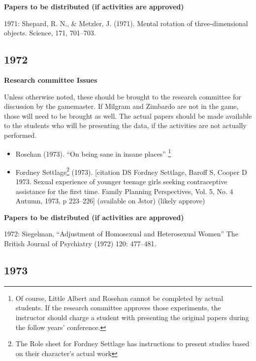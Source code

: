 \begin{refsection}
\begin{itemize}
\end{itemize}

\textbf{Papers to be distributed (if activities are approved)}

1971: Shepard, R. N., \& Metzler, J. (1971). Mental rotation of three-dimensional objects. Science, 171, 701--703.

\newpage

\subsection{1972}
\label{1972}

\textbf{Research committee Issues}

Unless otherwise noted, these should be brought to the research committee for discussion by the gamemaster. If Milgram and Zimbardo are not in the game, those will need to be brought as well. The actual papers should be made available to the students who will be presenting the data, if the activities are not actually performed.

\begin{itemize}
\item Rosehan (1973). ``On being sane in insane places'' \footnote{Of course, Little Albert and Rosehan cannot be completed by actual students. If the research committee approves those experiments, the instructor should charge a student with presenting the original papers during the follow years' conference.}

\item Fordney Settlage\footnote{The Role sheet for Fordney Settlage has instructions to present studies based on their character's actual work} (1973). [citation DS Fordney Settlage, Baroff S, Cooper D 1973. Sexual experience of younger teenage girls seeking contraceptive assistance for the first time. Family Planning Perspectives, Vol. 5, No. 4 Autumn, 1973, p 223--226] (available on Jstor) (likely approve)

\end{itemize}

\textbf{Papers to be distributed (if activities are approved)}

1972: Siegelman, ``Adjustment of Homosexual and Heterosexual Women'' The British Journal of Psychiatry (1972) 120: 477--481.

\newpage

\subsection{1973}
\label{1973}


\end{refsection}
